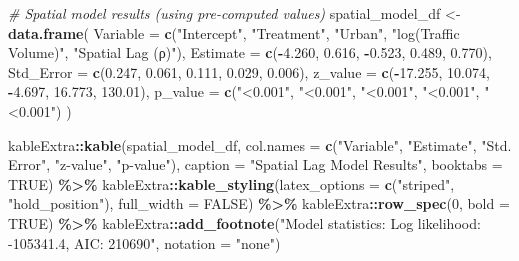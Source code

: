 \documentclass[
]{article}
\newenvironment{Shaded}{\begin{snugshade}}{\end{snugshade}}
\newcommand{\AttributeTok}[1]{\textcolor[rgb]{0.13,0.29,0.53}{#1}}
\newcommand{\CommentTok}[1]{\textcolor[rgb]{0.56,0.35,0.01}{\textit{#1}}}
\newcommand{\ConstantTok}[1]{\textcolor[rgb]{0.56,0.35,0.01}{#1}}
\newcommand{\DecValTok}[1]{\textcolor[rgb]{0.00,0.00,0.81}{#1}}
\newcommand{\FloatTok}[1]{\textcolor[rgb]{0.00,0.00,0.81}{#1}}
\newcommand{\FunctionTok}[1]{\textcolor[rgb]{0.13,0.29,0.53}{\textbf{#1}}}
\newcommand{\NormalTok}[1]{#1}
\newcommand{\OtherTok}[1]{\textcolor[rgb]{0.56,0.35,0.01}{#1}}
\newcommand{\SpecialCharTok}[1]{\textcolor[rgb]{0.81,0.36,0.00}{\textbf{#1}}}
\newcommand{\StringTok}[1]{\textcolor[rgb]{0.31,0.60,0.02}{#1}}
\begin{document}
\begin{Shaded}
\begin{Highlighting}[]
\CommentTok{\# Spatial model results (using pre{-}computed values)}
\NormalTok{spatial\_model\_df }\OtherTok{\textless{}{-}} \FunctionTok{data.frame}\NormalTok{(}
  \AttributeTok{Variable =} \FunctionTok{c}\NormalTok{(}\StringTok{"Intercept"}\NormalTok{, }\StringTok{"Treatment"}\NormalTok{, }\StringTok{"Urban"}\NormalTok{, }\StringTok{"log(Traffic Volume)"}\NormalTok{, }\StringTok{"Spatial Lag (ρ)"}\NormalTok{),}
  \AttributeTok{Estimate =} \FunctionTok{c}\NormalTok{(}\SpecialCharTok{{-}}\FloatTok{4.260}\NormalTok{, }\FloatTok{0.616}\NormalTok{, }\SpecialCharTok{{-}}\FloatTok{0.523}\NormalTok{, }\FloatTok{0.489}\NormalTok{, }\FloatTok{0.770}\NormalTok{),}
  \AttributeTok{Std\_Error =} \FunctionTok{c}\NormalTok{(}\FloatTok{0.247}\NormalTok{, }\FloatTok{0.061}\NormalTok{, }\FloatTok{0.111}\NormalTok{, }\FloatTok{0.029}\NormalTok{, }\FloatTok{0.006}\NormalTok{),}
  \AttributeTok{z\_value =} \FunctionTok{c}\NormalTok{(}\SpecialCharTok{{-}}\FloatTok{17.255}\NormalTok{, }\FloatTok{10.074}\NormalTok{, }\SpecialCharTok{{-}}\FloatTok{4.697}\NormalTok{, }\FloatTok{16.773}\NormalTok{, }\FloatTok{130.01}\NormalTok{),}
  \AttributeTok{p\_value =} \FunctionTok{c}\NormalTok{(}\StringTok{"\textless{}0.001"}\NormalTok{, }\StringTok{"\textless{}0.001"}\NormalTok{, }\StringTok{"\textless{}0.001"}\NormalTok{, }\StringTok{"\textless{}0.001"}\NormalTok{, }\StringTok{"\textless{}0.001"}\NormalTok{)}
\NormalTok{)}

\NormalTok{kableExtra}\SpecialCharTok{::}\FunctionTok{kable}\NormalTok{(spatial\_model\_df, }
                 \AttributeTok{col.names =} \FunctionTok{c}\NormalTok{(}\StringTok{"Variable"}\NormalTok{, }\StringTok{"Estimate"}\NormalTok{, }\StringTok{"Std. Error"}\NormalTok{, }\StringTok{"z{-}value"}\NormalTok{, }\StringTok{"p{-}value"}\NormalTok{),}
                 \AttributeTok{caption =} \StringTok{"Spatial Lag Model Results"}\NormalTok{,}
                 \AttributeTok{booktabs =} \ConstantTok{TRUE}\NormalTok{) }\SpecialCharTok{\%\textgreater{}\%}
\NormalTok{  kableExtra}\SpecialCharTok{::}\FunctionTok{kable\_styling}\NormalTok{(}\AttributeTok{latex\_options =} \FunctionTok{c}\NormalTok{(}\StringTok{"striped"}\NormalTok{, }\StringTok{"hold\_position"}\NormalTok{),}
                           \AttributeTok{full\_width =} \ConstantTok{FALSE}\NormalTok{) }\SpecialCharTok{\%\textgreater{}\%}
\NormalTok{  kableExtra}\SpecialCharTok{::}\FunctionTok{row\_spec}\NormalTok{(}\DecValTok{0}\NormalTok{, }\AttributeTok{bold =} \ConstantTok{TRUE}\NormalTok{) }\SpecialCharTok{\%\textgreater{}\%}
\NormalTok{  kableExtra}\SpecialCharTok{::}\FunctionTok{add\_footnote}\NormalTok{(}\StringTok{"Model statistics: Log likelihood: {-}105341.4, AIC: 210690"}\NormalTok{, }
                          \AttributeTok{notation =} \StringTok{"none"}\NormalTok{)}
\end{Highlighting}
\end{Shaded}
\end{document}
